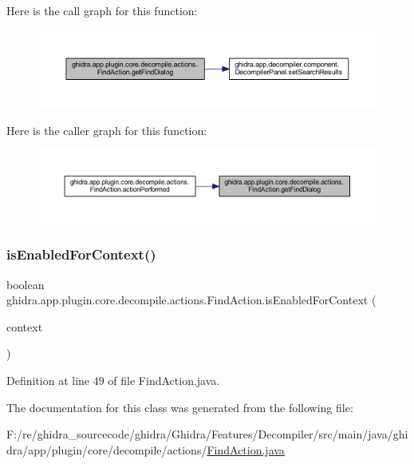 Here is the call graph for this function\+:
\nopagebreak
\begin{figure}[H]
\begin{center}
\leavevmode
\includegraphics[width=350pt]{classghidra_1_1app_1_1plugin_1_1core_1_1decompile_1_1actions_1_1_find_action_a56f348b40820d2f851835e40637cef93_cgraph}
\end{center}
\end{figure}
Here is the caller graph for this function\+:
\nopagebreak
\begin{figure}[H]
\begin{center}
\leavevmode
\includegraphics[width=350pt]{classghidra_1_1app_1_1plugin_1_1core_1_1decompile_1_1actions_1_1_find_action_a56f348b40820d2f851835e40637cef93_icgraph}
\end{center}
\end{figure}
\mbox{\label{classghidra_1_1app_1_1plugin_1_1core_1_1decompile_1_1actions_1_1_find_action_ab8667102b1d2308c7a4de72d62223da2}} 
\subsubsection{\texorpdfstring{isEnabledForContext()}{isEnabledForContext()}}
{\footnotesize\ttfamily boolean ghidra.\+app.\+plugin.\+core.\+decompile.\+actions.\+Find\+Action.\+is\+Enabled\+For\+Context (\begin{DoxyParamCaption}\item[{Action\+Context}]{context }\end{DoxyParamCaption})\hspace{0.3cm}{\ttfamily [inline]}}



Definition at line 49 of file Find\+Action.\+java.



The documentation for this class was generated from the following file\+:\begin{DoxyCompactItemize}
\item 
F\+:/re/ghidra\+\_\+sourcecode/ghidra/\+Ghidra/\+Features/\+Decompiler/src/main/java/ghidra/app/plugin/core/decompile/actions/\mbox{\hyperlink{_find_action_8java}{Find\+Action.\+java}}\end{DoxyCompactItemize}
